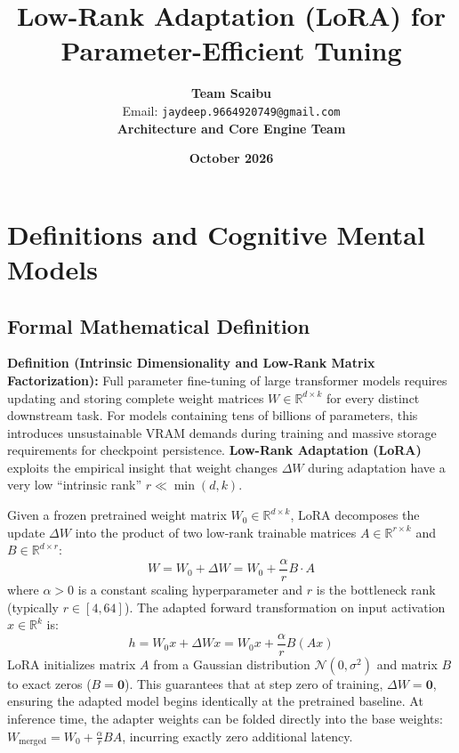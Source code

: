 \documentclass[11pt,a4paper]{article}
\title{\textbf{Low-Rank Adaptation (LoRA) for Parameter-Efficient Tuning}}
\author{\textbf{Team Scaibu} \\ \small Email: \texttt{jaydeep.9664920749@gmail.com} \\ \small \textbf{Architecture and Core Engine Team}}
\date{\textbf{October 2026}}
\theoremstyle{definition}
\begin{document}
\maketitle

\section{Definitions and Cognitive Mental Models}

\subsection{Formal Mathematical Definition}
\textbf{Definition (Intrinsic Dimensionality and Low-Rank Matrix Factorization):}
Full parameter fine-tuning of large transformer models requires updating and storing complete weight matrices $W \in \mathbb{R}^{d \times k}$ for every distinct downstream task. For models containing tens of billions of parameters, this introduces unsustainable VRAM demands during training and massive storage requirements for checkpoint persistence. \textbf{Low-Rank Adaptation (LoRA)} exploits the empirical insight that weight changes $\Delta W$ during adaptation have a very low ``intrinsic rank'' $r \ll \min(d, k)$.

Given a frozen pretrained weight matrix $W_0 \in \mathbb{R}^{d \times k}$, LoRA decomposes the update $\Delta W$ into the product of two low-rank trainable matrices $A \in \mathbb{R}^{r \times k}$ and $B \in \mathbb{R}^{d \times r}$:
{\boldmath
\begin{equation}
W = W_0 + \Delta W = W_0 + \frac{\alpha}{r} B \cdot A
\end{equation}
}
where $\alpha > 0$ is a constant scaling hyperparameter and $r$ is the bottleneck rank (typically $r \in [4, 64]$).
The adapted forward transformation on input activation $x \in \mathbb{R}^k$ is:
{\boldmath
\begin{equation}
h = W_0 x + \Delta W x = W_0 x + \frac{\alpha}{r} B(Ax)
\end{equation}
}
LoRA initializes matrix $A$ from a Gaussian distribution $\mathcal{N}(0, \sigma^2)$ and matrix $B$ to exact zeros ($B = \mathbf{0}$). This guarantees that at step zero of training, $\Delta W = \mathbf{0}$, ensuring the adapted model begins identically at the pretrained baseline. At inference time, the adapter weights can be folded directly into the base weights: $W_{\text{merged}} = W_0 + \frac{\alpha}{r}BA$, incurring exactly zero additional latency.
\end{document}
